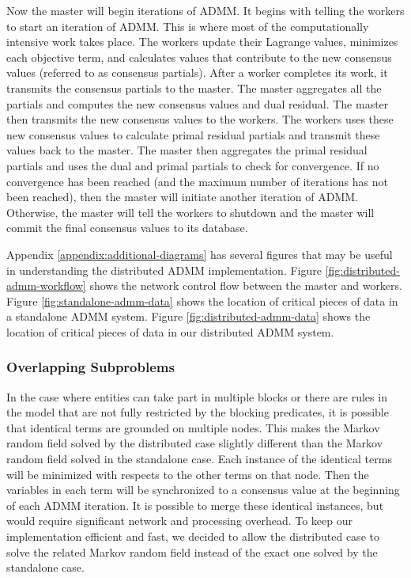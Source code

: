 \documentclass{article}
\begin{document}
        Now the master will begin iterations of ADMM.
        It begins with telling the workers to start an iteration of ADMM.
        This is where most of the computationally intensive work takes place.
        The workers update their Lagrange values, minimizes each objective term, and calculates values that contribute to the new consensus values (referred to as consensus partials).
        After a worker completes its work, it transmits the consensus partials to the master.
        The master aggregates all the partials and computes the new consensus values and dual residual.
        The master then transmits the new consensus values to the workers.
        The workers uses these new consensus values to calculate primal residual partials and transmit these values back to the master.
        The master then aggregates the primal residual partials and uses the dual and primal partials to check for convergence.
        If no convergence has been reached (and the maximum number of iterations has not been reached), then the master will initiate another iteration of ADMM.
        Otherwise, the master will tell the workers to shutdown and the master will commit the final consensus values to its database.

        Appendix \ref{appendix:additional-diagrams} has several figures that may be useful in understanding the distributed ADMM implementation.
        Figure \ref{fig:distributed-admm-workflow} shows the network control flow between the master and workers.
        Figure \ref{fig:standalone-admm-data} shows the location of critical pieces of data in a standalone ADMM system.
        Figure \ref{fig:distributed-admm-data} shows the location of critical pieces of data in our distributed ADMM system.

        \subsubsection{Overlapping Subproblems}
            \label{sec:dist-overlapping-subproblems}

             In the case where entities can take part in multiple blocks or there are rules in the model that are not fully restricted by the blocking predicates, it is possible that identical terms are grounded on multiple nodes.
             This makes the Markov random field solved by the distributed case slightly different than the Markov random field solved in the standalone case.
             Each instance of the identical terms will be minimized with respects to the other terms on that node.
             Then the variables in each term will be synchronized to a consensus value at the beginning of each ADMM iteration.
             It is possible to merge these identical instances, but would require significant network and processing overhead.
             To keep our implementation efficient and fast, we decided to allow the distributed case to solve the related Markov random field instead of the exact one solved by the standalone case.
\end{document}
